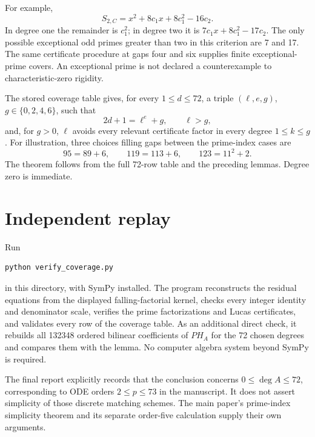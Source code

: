 \documentclass[11pt]{article}
\begin{document}
For example,
\[
 S_{2,C}=x^2+8c_1x+8c_1^2-16c_2.
\]
In degree one the remainder is \(c_1^2\); in degree two it is
\(7c_1x+8c_1^2-17c_2\).
The only possible exceptional odd primes greater than two in this
criterion are 7 and 17.
The same certificate procedure at gaps four and six supplies finite
exceptional-prime covers.
An exceptional prime is not declared a counterexample to
characteristic-zero rigidity.

The stored coverage table gives, for every \(1\le d\le72\),
a triple \((\ell,e,g)\), \(g\in\{0,2,4,6\}\), such that
\[
 2d+1=\ell^e+g,\qquad \ell>g,
\]
and, for \(g>0\), \(\ell\) avoids every relevant certificate factor
in every degree \(1\le k\le g\).
For illustration, three choices filling gaps between the
prime-index cases are
\[
 95=89+6,\qquad119=113+6,\qquad123=11^2+2.
\]
The theorem follows from the full 72-row table and the preceding
lemmas. Degree zero is immediate.

\section{Independent replay}

Run
\begin{verbatim}
python verify_coverage.py
\end{verbatim}
in this directory, with SymPy installed.
The program reconstructs the residual equations from the displayed
falling-factorial kernel, checks every integer identity and
denominator scale, verifies the prime factorizations and Lucas
certificates, and validates every row of the coverage table.
As an additional direct check, it rebuilds all 132348 ordered
bilinear coefficients of \(P H_A\) for the 72 chosen degrees and
compares them with the lemma.
No computer algebra system beyond SymPy is required.

The final report explicitly records that the conclusion concerns
\(0\le\deg A\le72\), corresponding to ODE orders \(2\le p\le73\)
in the manuscript. It does not assert simplicity of those discrete
matching schemes. The main paper's prime-index simplicity theorem
and its separate order-five calculation supply their own arguments.
\end{document}
